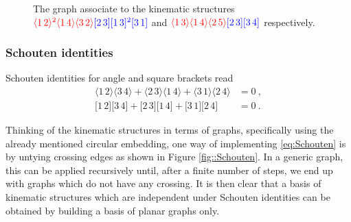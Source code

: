 \documentclass[aps,prd,nofootinbib,twocolumn,10pt]{revtex4-2}
\newcommand{\agl}[2]{\langle#1\, #2 \rangle}
\newcommand{\sqr}[2]{\lbrack #1\, #2 \rbrack}
\begin{document}
\begin{figure}[!ht]
\begin{center}
	    \end{center}
    \caption{The graph associate to the kinematic structures $\textcolor{red}{\agl{1}{2}^2 \agl{1}{4} \agl{3}{2}} \textcolor{blue}{\sqr{2}{3}\sqr{1}{3}^2 \sqr{3}{1}}$ and $\textcolor{red}{\agl{1}{3} \agl{1}{4} \agl{2}{5}} \textcolor{blue}{\sqr{2}{3}\sqr{3}{4}}$ respectively.}
	\label{fig:2graphexample}
\end{figure}

\subsubsection{Schouten identities}

Schouten identities for angle and square brackets read
\begin{equation}\label{eq:Schouten}
\begin{aligned}
    \agl{1}{2}\agl{3}{4} + \agl{2}{3}\agl{1}{4} + \agl{3}{1}\agl{2}{4} &= 0\ ,\\
    \sqr{1}{2}\sqr{3}{4} + \sqr{2}{3}\sqr{1}{4} + \sqr{3}{1}\sqr{2}{4} &= 0\ .
\end{aligned}
\end{equation}

Thinking of the kinematic structures in terms of graphs, specifically using the already mentioned circular embedding, one way of implementing \eqref{eq:Schouten} is by untying crossing edges as shown in Figure \ref{fig::Schouten}. In a generic graph, this can be applied recursively until, after a finite number of steps, we end up with graphs which do not have any crossing. It is then clear that a basis of kinematic structures which are independent under Schouten identities can be obtained by building a basis of planar graphs only.
\end{document}
